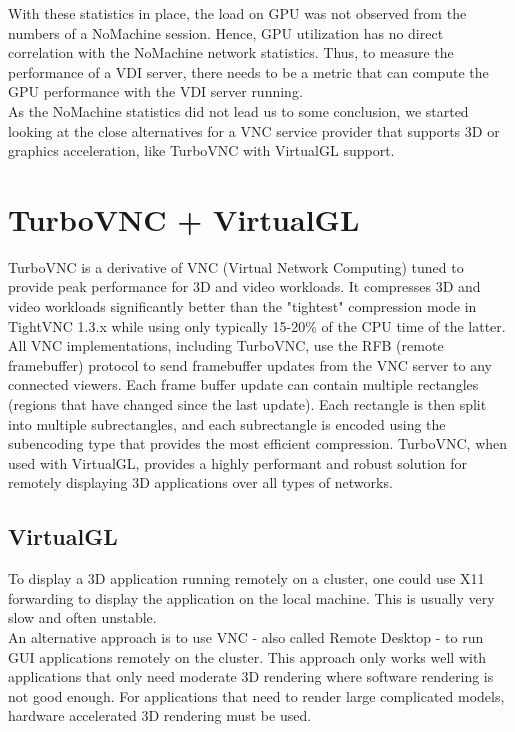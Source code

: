 \documentclass[a4paper,12pt, final]{report}
\begin{document}
\noindent With these statistics in place, the load on GPU was not observed from the numbers of a NoMachine session. Hence, GPU utilization has no direct correlation with the NoMachine network statistics. Thus, to measure the performance of a VDI server, there needs to be a metric that can compute the GPU performance with the VDI server running.\\

\noindent As the NoMachine statistics did not lead us to some conclusion, we started looking at the close alternatives for a VNC service provider that supports 3D or graphics acceleration, like TurboVNC with VirtualGL support.

\section{TurboVNC + VirtualGL}
TurboVNC is a derivative of VNC (Virtual Network Computing) tuned to provide peak performance for 3D and video workloads. It compresses 3D and video workloads significantly better than the "tightest" compression mode in TightVNC 1.3.x while using only typically 15-20\% of the CPU time of the latter.\\

\noindent All VNC implementations, including TurboVNC, use the RFB (remote framebuffer) protocol to send framebuffer updates from the VNC server to any connected viewers. Each frame buffer update can contain multiple rectangles (regions that have changed since the last update). Each rectangle is then split into multiple subrectangles, and each subrectangle is encoded using the subencoding type that provides the most efficient compression. TurboVNC, when used with VirtualGL, provides a highly performant and robust solution for remotely displaying 3D applications over all types of networks. \cite{turbovnc_intro}

\subsection{VirtualGL}
To display a 3D application running remotely on a cluster, one could use X11 forwarding to display the application on the local machine. This is usually very slow and often unstable.\\

\noindent An alternative approach is to use VNC - also called Remote Desktop - to run GUI applications remotely on the cluster. This approach only works well with applications that only need moderate 3D rendering where software rendering is not good enough. For applications that need to render large complicated models, hardware accelerated 3D rendering must be used.\\
\end{document}
